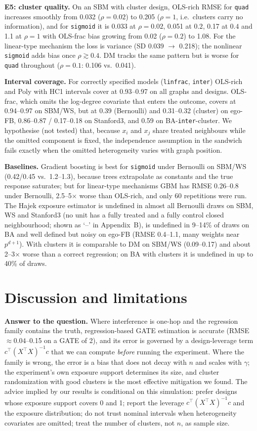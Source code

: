 \documentclass{article}
\begin{document}
\textbf{E5: cluster quality.} On an SBM with cluster design, OLS-rich RMSE for \texttt{quad} increases smoothly from 0.032 ($\rho=0.02$) to 0.205 ($\rho=1$, i.e.\ clusters carry no information), and for \texttt{sigmoid} it is 0.033 at $\rho=0.02$, 0.051 at $0.2$, 0.17 at $0.4$ and 1.1 at $\rho=1$ with OLS-frac bias growing from 0.02 ($\rho=0.2$) to 1.08. For the linear-type mechanism the loss is variance (SD 0.039 $\to$ 0.218); the nonlinear \texttt{sigmoid} adds bias once $\rho\gtrsim0.4$. DM tracks the same pattern but is worse for \texttt{quad} throughout ($\rho=0.1$: 0.106 vs.\ 0.041).

\textbf{Interval coverage.} For correctly specified models (\texttt{linfrac}, \texttt{inter}) OLS-rich and Poly with HC1 intervals cover at 0.93--0.97 on all graphs and designs. OLS-frac, which omits the log-degree covariate that enters the outcome, covers at 0.94--0.97 on SBM/WS, but at 0.39 (Bernoulli) and 0.31--0.32 (cluster) on ego-FB, 0.86--0.87 / 0.17--0.18 on Stanford3, and 0.59 on BA-\texttt{inter}-cluster. We hypothesise (not tested) that, because $x_i$ and $x_j$ share treated neighbours while the omitted component is fixed, the independence assumption in the sandwich fails exactly when the omitted heterogeneity varies with graph position.

\textbf{Baselines.} Gradient boosting is best for \texttt{sigmoid} under Bernoulli on SBM/WS (0.42/0.45 vs.\ 1.2--1.3), because trees extrapolate as constants and the true response saturates; but for linear-type mechanisms GBM has RMSE 0.26--0.8 under Bernoulli, 2.5--5$\times$ worse than OLS-rich, and only $60$ repetitions were run. The Hajek exposure estimator is undefined in almost all Bernoulli draws on SBM, WS and Stanford3 (no unit has a fully treated and a fully control closed neighbourhood; shown as `--' in Appendix~B), is undefined in 9--14\% of draws on BA and well defined but noisy on ego-FB (RMSE 0.4--1.1, many weights near $p^{d+1}$). With clusters it is comparable to DM on SBM/WS (0.09--0.17) and about 2--3$\times$ worse than a correct regression; on BA with clusters it is undefined in up to 40\% of draws.

\section{Discussion and limitations}
\textbf{Answer to the question.} Where interference is one-hop and the regression family contains the truth, regression-based GATE estimation is accurate (RMSE $\approx0.04$--0.15 on a GATE of 2), and its error is governed by a design-leverage term $c^\top(X^\top X)^{-1}c$ that we can compute \emph{before} running the experiment. Where the family is wrong, the error is a bias that does not decay with $n$ and scales with $\gamma$; the experiment's own exposure support determines its size, and cluster randomization with good clusters is the most effective mitigation we found. The advice implied by our results is conditional on this simulation: prefer designs whose exposure support covers 0 and 1; report the leverage $c^\top(X^\top X)^{-1}c$ and the exposure distribution; do not trust nominal intervals when heterogeneity covariates are omitted; treat the number of clusters, not $n$, as sample size.
\end{document}
